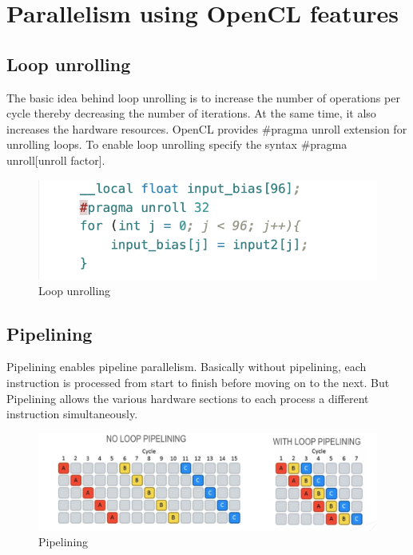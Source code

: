 \section{Parallelism using OpenCL features}
\subsection{Loop unrolling}
The basic idea behind loop unrolling is to increase the number of operations per cycle thereby decreasing the number of iterations. At the same time, it also increases the hardware resources. OpenCL provides \#pragma unroll extension
for unrolling loops. To enable loop unrolling specify the syntax \#pragma unroll[unroll factor].
\begin{figure}[!htb]
    \centering
    \includegraphics[width=\textwidth,height=\textheight,keepaspectratio]{img/Loop_unrolling.png}
    \caption{Loop unrolling}
    \label{Loop unrolling}
\end{figure}
\newpage
\subsection{Pipelining}
Pipelining enables pipeline parallelism. Basically without pipelining, each instruction is processed from start to finish before moving on to the next. But Pipelining allows the various hardware sections to each process a different instruction simultaneously.
\begin{figure}[h!]
    \centering
    \includegraphics[scale=0.4]{img/Pipelining.png}
    \caption{Pipelining}
\end{figure}





